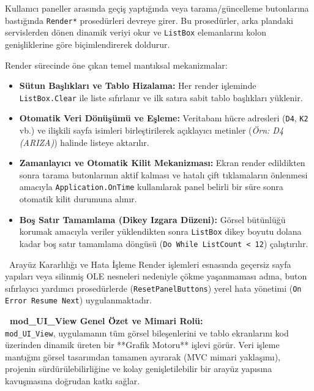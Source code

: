 Kullanıcı paneller arasında geçiş yaptığında veya tarama/güncelleme butonlarına bastığında \texttt{Render*} prosedürleri devreye girer. Bu prosedürler, arka plandaki servislerden dönen dinamik veriyi okur ve \texttt{ListBox} elemanlarını kolon genişliklerine göre biçimlendirerek doldurur.

\newpage
Render sürecinde öne çıkan temel mantıksal mekanizmalar:
\begin{itemize}\setlength{\itemsep}{0pt}\setlength{\parskip}{1pt}
    \item \textbf{Sütun Başlıkları ve Tablo Hizalama:} Her render işleminde \texttt{ListBox.Clear} ile liste sıfırlanır ve ilk satıra sabit tablo başlıkları yüklenir.
    \item \textbf{Otomatik Veri Dönüşümü ve Eşleme:} Veritabanı hücre adresleri (\texttt{D4}, \texttt{K2} vb.) ve ilişkili sayfa isimleri birleştirilerek açıklayıcı metinler (\textit{Örn: D4 (ARIZA)}) halinde listeye aktarılır.
    \item \textbf{Zamanlayıcı ve Otomatik Kilit Mekanizması:} Ekran render edildikten sonra tarama butonlarının aktif kalması ve hatalı çift tıklamaların önlenmesi amacıyla \texttt{Application.OnTime} kullanılarak panel belirli bir süre sonra otomatik kilit durumuna alınır.
    \item \textbf{Boş Satır Tamamlama (Dikey Izgara Düzeni):} Görsel bütünlüğü korumak amacıyla veriler yüklendikten sonra \texttt{ListBox} dikey boyutu dolana kadar boş satır tamamlama döngüsü (\texttt{Do While ListCount < 12}) çalıştırılır.
\end{itemize}

\vspace{0.15cm}

\begin{warningbox}{\faExclamationTriangle\ Arayüz Kararlılığı ve Hata İşleme}
Render işlemleri esnasında geçersiz sayfa yapıları veya silinmiş OLE nesneleri nedeniyle çökme yaşanmaması adına, buton sıfırlayıcı yardımcı prosedürlerde (\texttt{ResetPanelButtons}) yerel hata yönetimi (\texttt{On Error Resume Next}) uygulanmaktadır.
\end{warningbox}

\vspace{0.4cm}

\begin{tcolorbox}[colback=yellow!15,colframe=orange!80!black,leftrule=3.5pt,boxrule=0.4pt,top=5pt,bottom=5pt]
    \textbf{\textcolor{orange!80!black}{\faInfoCircle\ mod\_UI\_View Genel Özet ve Mimari Rolü:}}\\
    \small \texttt{mod\_UI\_View}, uygulamanın tüm görsel bileşenlerini ve tablo ekranlarını kod üzerinden dinamik üreten bir **Grafik Motoru** işlevi görür. Veri işleme mantığını görsel tasarımdan tamamen ayırarak (MVC mimari yaklaşımı), projenin sürdürülebilirliğine ve kolay genişletilebilir bir arayüz yapısına kavuşmasına doğrudan katkı sağlar.
\end{tcolorbox}

